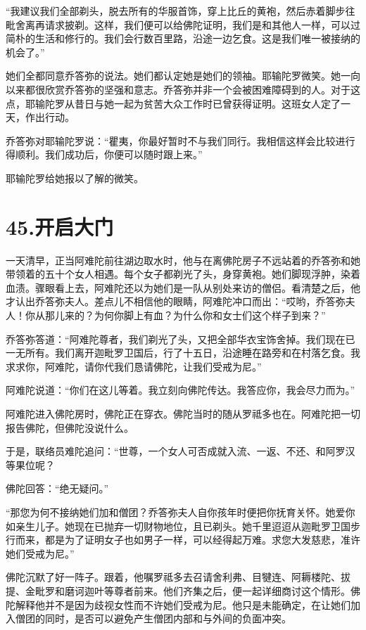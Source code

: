 \documentclass[12pt,twoside,openany]{book}
\begin{document}
“我建议我们全部剃头，脱去所有的华服首饰，穿上比丘的黄袍，然后赤着脚步往毗舍离再请求披剃。这样，我们便可以给佛陀证明，我们是和其他人一样，可以过简朴的生活和修行的。我们会行数百里路，沿途一边乞食。这是我们唯一被接纳的机会了。”

她们全都同意乔答弥的说法。她们都认定她是她们的领袖。耶输陀罗微笑。她一向以来都很欣赏乔答弥的坚强和意志。乔答弥并非一个会被困难障碍到的人。对于这点，耶输陀罗从昔日与她一起为贫苦大众工作时已曾获得证明。这班女人定了一天，作出行动。

乔答弥对耶输陀罗说：“瞿夷，你最好暂时不与我们同行。我相信这样会比较进行得顺利。我们成功后，你便可以随时跟上来。”

耶输陀罗给她报以了解的微笑。


\chapter{45.开启大门}\label{ch45}

一天清早，正当阿难陀前往湖边取水时，他与在离佛陀房子不远站着的乔答弥和她带领着的五十个女人相遇。每个女子都剃光了头，身穿黄袍。她们脚现浮肿，染着血渍。骤眼看上去，阿难陀还以为她们是一队从别处来访的僧侣。看清楚之后，他才认出乔答弥夫人。差点儿不相信他的眼睛，阿难陀冲口而出：“哎哟，乔答弥夫人！你从那儿来的？为何你脚上有血？为什么你和女士们这个样子到来？”

乔答弥答道：“阿难陀尊者，我们剃光了头，又把全部华衣宝饰舍掉。我们现在已一无所有。我们离开迦毗罗卫国后，行了十五日，沿途睡在路旁和在村落乞食。我求求你，阿难陀，请你代我们恳请佛陀，让我们受戒为尼。”

阿难陀说道：“你们在这儿等着。我立刻向佛陀传达。我答应你，我会尽力而为。”

阿难陀进入佛陀房时，佛陀正在穿衣。佛陀当时的随从罗祗多也在。阿难陀把一切报告佛陀，但佛陀没说什么。

于是，联络员难陀追问：“世尊，一个女人可否成就入流、一返、不还、和阿罗汉等果位呢？

佛陀回答：“绝无疑问。”

“那您为何不接纳她们加和僧团？乔答弥夫人自你孩年时便把你抚育关怀。她爱你如亲生儿子。她现在已抛弃一切财物地位，且已剃头。她千里迢迢从迦毗罗卫国步行而来，都是为了证明女子也如男子一样，可以经得起万难。求您大发慈悲，准许她们受戒为尼。”

佛陀沉默了好一阵子。跟着，他嘱罗祗多去召请舍利弗、目犍连、阿耨楼陀、拔提、金毗罗和磨诃迦叶等尊者前来。他们齐集之后，便一起详细商讨这个情形。佛陀解释他并不是因为歧视女性而不许她们受戒为尼。他只是未能确定，在让她们加入僧团的同时，是否可以避免产生僧团内部和与外间的负面冲突。
\end{document}
